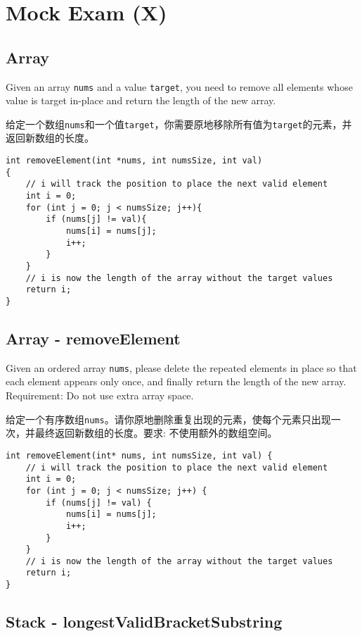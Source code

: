 \documentclass[a4paper]{article}
\begin{document}
\section{Mock Exam (X)}

\subsection{Array}

Given an array \verb|nums| and a value \verb|target|, you need to remove all elements whose value is target in-place and return the length of the new array.

给定一个数组\verb|nums|和一个值\verb|target|，你需要原地移除所有值为\verb|target|的元素，并返回新数组的长度。

\begin{verbatim}
int removeElement(int *nums, int numsSize, int val)
{
    // i will track the position to place the next valid element
    int i = 0; 
    for (int j = 0; j < numsSize; j++){
        if (nums[j] != val){
            nums[i] = nums[j];
            i++;
        }
    }
    // i is now the length of the array without the target values
    return i; 
}
\end{verbatim}

\subsection{Array - removeElement}

Given an ordered array \verb|nums|, please delete the repeated elements in place so that each element appears only once, and finally return the length of the new array. Requirement: Do not use extra array space.

给定一个有序数组\verb|nums|。请你原地删除重复出现的元素，使每个元素只出现一次，并最终返回新数组的长度。要求: 不使用额外的数组空间。

\begin{verbatim}
int removeElement(int* nums, int numsSize, int val) {
	// i will track the position to place the next valid element
    int i = 0;
    for (int j = 0; j < numsSize; j++) {
        if (nums[j] != val) {
            nums[i] = nums[j];
            i++;
        }
    }
    // i is now the length of the array without the target values
    return i;
}
\end{verbatim}

\newpage

\subsection{Stack - longestValidBracketSubstring}
\end{document}
